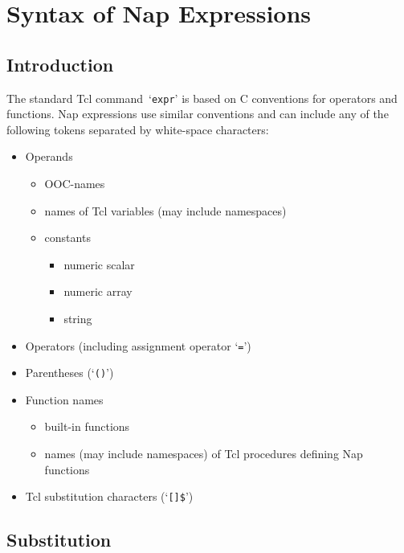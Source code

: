 
\section{Syntax of Nap Expressions}
    \label{syntax}

\subsection{Introduction}
      \label{syntax-Introduction}

The standard Tcl command\  `\texttt{expr}' is based on C conventions for operators and
    functions. Nap expressions use similar conventions and can include
    any of the following tokens separated by white-space
    characters:
    \begin{itemize}
      \item Operands
      \begin{itemize}
        \item OOC-names
        \item names of Tcl variables (may include namespaces)
        \item constants
        \begin{itemize}
          \item numeric scalar
          \item numeric array
          \item string
        \end{itemize}
      \end{itemize}
      \item Operators (including assignment operator `\texttt{=}')
      \item Parentheses (`\texttt{()}')
      \item Function names
      \begin{itemize}
        \item built-in functions
        \item names (may include namespaces) of Tcl procedures defining
        Nap functions
      \end{itemize}
      \item Tcl substitution characters (`\texttt{[]\$}')
    \end{itemize}

\subsection{Substitution}
      \label{syntax-Substitution}

